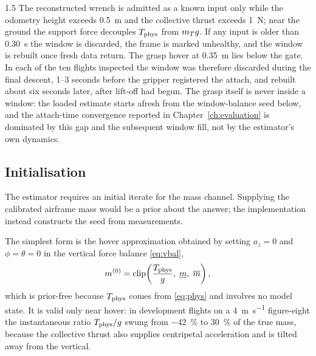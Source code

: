 \begin{spacing}{1.5}
The reconstructed wrench is admitted as a known input only while the odometry
height exceeds \SI{0.5}{\meter} and the collective thrust exceeds
\SI{1}{\newton}; near the ground the support force decouples $T_{\mathrm{phys}}$ from
$m_T g$. If any input is older than \SI{0.30}{\second} the window is discarded,
the frame is marked unhealthy, and the window is rebuilt once fresh data return.
The grasp hover at \SI{0.35}{\meter} lies below the gate. In each of the ten
flights inspected the window was therefore discarded during
the final descent, 1--3 seconds before the gripper registered the attach, and
rebuilt about six seconds later, after lift-off had begun. The grasp itself is
never inside a window: the loaded estimate starts afresh from the window-balance
seed below, and the attach-time convergence reported in
Chapter~\ref{ch:evaluation} is dominated by this gap and the subsequent window
fill, not by the estimator's own dynamics.

\subsection{Initialisation}\label{sec:model:seed}

The estimator requires an initial iterate for the mass channel. Supplying the
calibrated airframe mass would be a prior about the answer; the implementation
instead constructs the seed from measurements.

The simplest form is the hover approximation obtained by setting $a_z=0$ and
$\phi=\theta=0$ in the vertical force balance \eqref{eq:vbal},
\begin{equation}
m^{(0)}=\operatorname{clip}\!\left(\frac{T_{\mathrm{phys}}}{g},\; \underline m,\; \overline m\right),
\label{eq:massseed}
\end{equation}
which is prior-free because $T_{\mathrm{phys}}$ comes from \eqref{eq:phys} and involves no
model state. It is valid only near hover: in development flights on a
\SI{4}{\meter\per\second} figure-eight the instantaneous ratio $T_{\mathrm{phys}}/g$ swung
from \SI{-42}{\percent} to \SI{+30}{\percent} of the true mass, because the
collective thrust also supplies centripetal acceleration and is tilted away from
the vertical.


\end{spacing}
